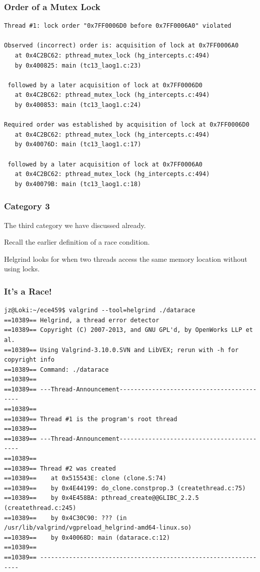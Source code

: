 \begin{frame}[fragile]
\frametitle{Order of a Mutex Lock}
{\scriptsize
\begin{verbatim}
Thread #1: lock order "0x7FF0006D0 before 0x7FF0006A0" violated

Observed (incorrect) order is: acquisition of lock at 0x7FF0006A0
   at 0x4C2BC62: pthread_mutex_lock (hg_intercepts.c:494)
   by 0x400825: main (tc13_laog1.c:23)

 followed by a later acquisition of lock at 0x7FF0006D0
   at 0x4C2BC62: pthread_mutex_lock (hg_intercepts.c:494)
   by 0x400853: main (tc13_laog1.c:24)

Required order was established by acquisition of lock at 0x7FF0006D0
   at 0x4C2BC62: pthread_mutex_lock (hg_intercepts.c:494)
   by 0x40076D: main (tc13_laog1.c:17)

 followed by a later acquisition of lock at 0x7FF0006A0
   at 0x4C2BC62: pthread_mutex_lock (hg_intercepts.c:494)
   by 0x40079B: main (tc13_laog1.c:18)
\end{verbatim}
}

\end{frame}

\begin{frame}
\frametitle{Category 3}

The third category we have discussed already.

  Recall the earlier definition of a race condition. 

 Helgrind looks for when two threads access the same memory location without using locks.

\end{frame}

\begin{frame}[fragile]
\frametitle{It's a Race!}
{\scriptsize
\begin{verbatim}
jz@Loki:~/ece459$ valgrind --tool=helgrind ./datarace
==10389== Helgrind, a thread error detector
==10389== Copyright (C) 2007-2013, and GNU GPL'd, by OpenWorks LLP et al.
==10389== Using Valgrind-3.10.0.SVN and LibVEX; rerun with -h for copyright info
==10389== Command: ./datarace
==10389== 
==10389== ---Thread-Announcement------------------------------------------
==10389== 
==10389== Thread #1 is the program's root thread
==10389== 
==10389== ---Thread-Announcement------------------------------------------
==10389== 
==10389== Thread #2 was created
==10389==    at 0x515543E: clone (clone.S:74)
==10389==    by 0x4E44199: do_clone.constprop.3 (createthread.c:75)
==10389==    by 0x4E458BA: pthread_create@@GLIBC_2.2.5 (createthread.c:245)
==10389==    by 0x4C30C90: ??? (in /usr/lib/valgrind/vgpreload_helgrind-amd64-linux.so)
==10389==    by 0x40068D: main (datarace.c:12)
==10389== 
==10389== ----------------------------------------------------------------
\end{verbatim}
}

\end{frame}

